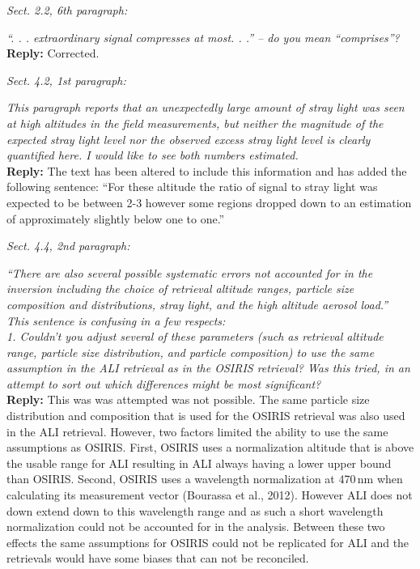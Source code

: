 \documentclass[12pt, notitlepage]{article}
\begin{document}
\textit{Sect. 2.2, 6th paragraph:}

\textit{``. . . extraordinary signal compresses at most. . .'' – do you mean ``comprises''?}\\

\textbf{Reply:} Corrected.

\hrulefill

\textit{Sect. 4.2, 1st paragraph:}

\textit{This paragraph reports that an unexpectedly large amount of stray light was seen at
high altitudes in the field measurements, but neither the magnitude of the expected
stray light level nor the observed excess stray light level is clearly quantified here. I
would like to see both numbers estimated.}\\

\textbf{Reply:} The text has been altered to include this information and has added the following sentence: ``For these altitude the ratio of signal to stray light was expected to be between 2-3 however some regions dropped down to an estimation of approximately slightly below one to one.''

\hrulefill

\textit{Sect. 4.4, 2nd paragraph:}

\textit{``There are also several possible systematic errors not accounted for in the inversion
including the choice of retrieval altitude ranges, particle size composition and distributions,
stray light, and the high altitude aerosol load.''}\\

\textit{This sentence is confusing in a few respects:}\\

\textit{1. Couldn't you adjust several of these parameters (such as retrieval altitude range,
particle size distribution, and particle composition) to use the same assumption in the
ALI retrieval as in the OSIRIS retrieval? Was this tried, in an attempt to sort out which
differences might be most significant?}\\

\textbf{Reply:} This was was attempted was not possible. The same particle size distribution and composition 
that is used for the OSIRIS retrieval was also used in the ALI retrieval.  However, two factors limited the ability to use the same assumptions as OSIRIS. First, OSIRIS uses a normalization altitude that is above the usable range for ALI resulting in ALI always having a lower upper bound than OSIRIS. Second, OSIRIS uses a wavelength normalization at 470\,nm when calculating its measurement vector (Bourassa et al., 2012). However ALI does not down extend down to this wavelength range and as such a short wavelength normalization could not be accounted for in the analysis. Between these two effects the same assumptions for OSIRIS could not be replicated for ALI and the retrievals would have some biases that can not be reconciled.\\
\end{document}
